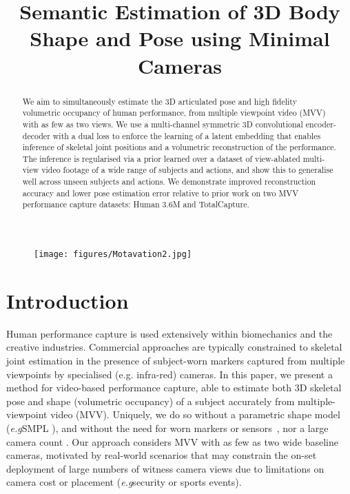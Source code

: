 \documentclass{bmvc2k}
\title{Semantic Estimation of 3D Body Shape and Pose using Minimal Cameras}
\newcommand{\squeezeup}{\vspace{-2mm}}
\newcommand{\eg}{e.\,g.\xspace}
\def\eg{\emph{e.g}\bmvaOneDot}
\begin{document}
\maketitle

\begin{abstract}
We aim to simultaneously estimate the 3D articulated pose and high fidelity volumetric occupancy of human performance, from multiple viewpoint video (MVV) with as few as two views. We use a multi-channel symmetric 3D convolutional encoder-decoder with a dual loss to enforce the learning of a latent embedding that enables inference of skeletal joint positions and a  volumetric reconstruction of the performance. The inference is regularised via a prior learned over a dataset of view-ablated multi-view video footage of a wide range of subjects and actions, and show this to generalise well across unseen subjects and actions.   We demonstrate improved reconstruction accuracy and lower pose estimation error relative to prior work on two MVV performance capture datasets: Human 3.6M and TotalCapture.
\end{abstract}
\squeezeup
\squeezeup
\begin{figure}[htp]
\centering
\texttt{[image: figures/Motavation2.jpg]}
\end{figure}
\section{Introduction}
Human performance capture is used extensively within biomechanics and the creative industries.  Commercial approaches are typically constrained to skeletal joint estimation in the presence of subject-worn markers captured from multiple viewpoints by specialised (e.g. infra-red) cameras.
In this paper, we present a method for video-based performance capture, able to estimate both 3D skeletal pose and shape (volumetric occupancy) of a subject accurately from multiple-viewpoint video (MVV). Uniquely, we do so without a parametric shape model (\eg SMPL \cite{loper2015SMPL}), and without the need for worn markers or sensors~\cite{PonsECCV18,trumble_total_2017}, nor a large camera count \cite{collet2015MSFVV}.  Our approach considers MVV with as few as two wide baseline cameras, motivated by real-world scenarios that may constrain the on-set deployment of large numbers of witness camera views due to limitations on camera cost or placement (\eg security or sports events).
\end{document}
